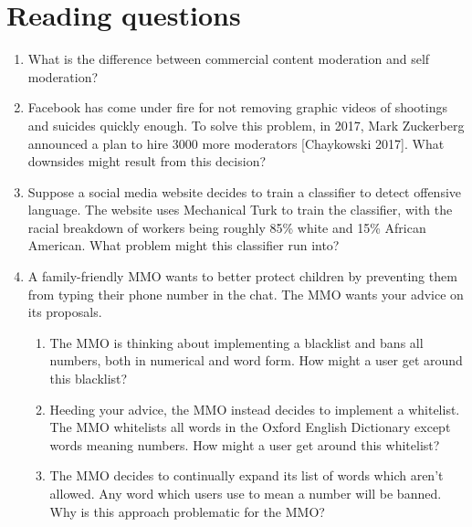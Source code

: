 \documentclass[class=book, crop=false]{standalone}
\begin{document}
\section{Reading questions}
\begin{enumerate}
    \item What is the difference between commercial content moderation and self moderation?
    
    \item Facebook has come under fire for not removing graphic videos of shootings and suicides quickly enough. To solve this problem, in 2017, Mark Zuckerberg announced a plan to hire 3000 more moderators [Chaykowski 2017]. What downsides might result from this decision?
    
    \item Suppose a social media website decides to train a classifier to detect offensive language. The website uses Mechanical Turk to train the classifier, with the racial breakdown of workers being roughly 85\% white and 15\% African American. What problem might this classifier run into?
    
    \item A family-friendly MMO wants to better protect children by preventing them from typing their phone number in the chat. The MMO wants your advice on its proposals.
    \begin{enumerate}
        \item The MMO is thinking about implementing a blacklist and bans all numbers, both in numerical and word form. How might a user get around this blacklist?
        \item Heeding your advice, the MMO instead decides to implement a whitelist. The MMO whitelists all words in the Oxford English Dictionary except words meaning numbers. How might a user get around this whitelist?
        \item The MMO decides to continually expand its list of words which aren't allowed. Any word which users use to mean a number will be banned. Why is this approach problematic for the MMO?
    \end{enumerate}
\end{enumerate}
\end{document}
